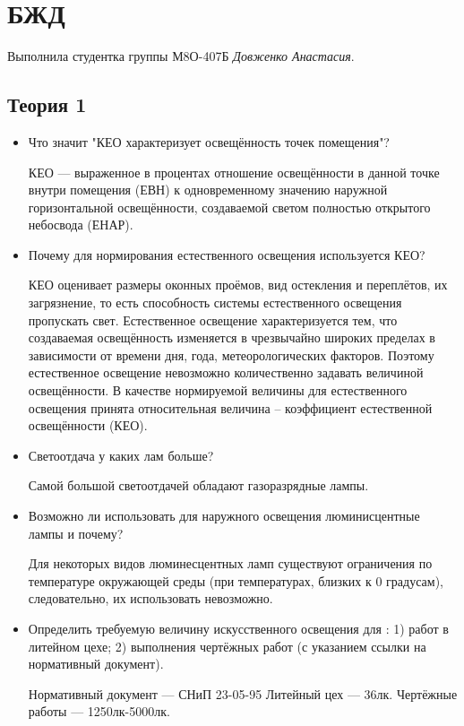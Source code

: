 \documentclass[12pt]{article}
\begin{document}
\section*{БЖД}

Выполнила студентка группы М8О-407Б \textit{Довженко Анастасия}.

\subsection*{Теория 1}
\begin{itemize}
\item Что значит "КЕО характеризует освещённость точек помещения"?

КЕО --- выраженное в процентах отношение освещённости в данной точке внутри помещения (ЕВН) к одновременному значению наружной горизонтальной освещённости, создаваемой светом полностью открытого небосвода (ЕНАР).

\item Почему для нормирования естественного освещения используется КЕО?

КЕО оценивает размеры оконных проёмов, вид остекления и переплётов, их загрязнение, то есть способность системы естественного освещения пропускать свет. Естественное освещение характеризуется тем, что создаваемая освещённость изменяется в чрезвычайно широких пределах в зависимости от времени дня, года, метеорологических факторов. Поэтому естественное освещение невозможно количественно задавать величиной освещённости. В качестве нормируемой величины для естественного освещения принята относительная величина – коэффициент естественной освещённости (КЕО).

\item Светоотдача у каких лам больше?

Самой большой светоотдачей обладают газоразрядные лампы.

\item Возможно ли использовать для наружного освещения люминисцентные лампы и почему?

Для некоторых видов люминесцентных ламп существуют ограничения по температуре окружающей среды (при температурах, близких к 0 градусам), следовательно, их использовать невозможно.

\item Определить требуемую величину искусственного освещения для : 1) работ в литейном цехе; 2) выполнения чертёжных работ (с указанием ссылки на нормативный документ).

Нормативный документ --- СНиП 23-05-95
Литейный цех --- 36лк.
Чертёжные работы --- 1250лк-5000лк.


\end{itemize}
\end{document}
